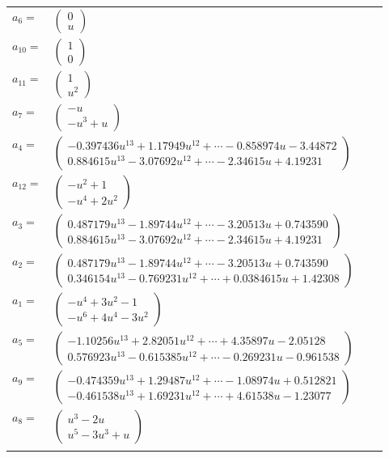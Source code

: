 \documentclass[1p]{elsarticle_modified}
\theoremstyle{definition}
\begin{document}
\begin{tabular}{m{7pt} m{180pt} m{7pt} m{180pt} }
\flushright $a_{6}=$&$\begin{pmatrix}0\\u\end{pmatrix}$ \\
\flushright $a_{10}=$&$\begin{pmatrix}1\\0\end{pmatrix}$ \\
\flushright $a_{11}=$&$\begin{pmatrix}1\\u^2\end{pmatrix}$ \\
\flushright $a_{7}=$&$\begin{pmatrix}- u\\- u^3+u\end{pmatrix}$ \\
\flushright $a_{4}=$&$\begin{pmatrix}-0.397436 u^{13}+1.17949 u^{12}+\cdots-0.858974 u-3.44872\\0.884615 u^{13}-3.07692 u^{12}+\cdots-2.34615 u+4.19231\end{pmatrix}$ \\
\flushright $a_{12}=$&$\begin{pmatrix}- u^2+1\\- u^4+2 u^2\end{pmatrix}$ \\
\flushright $a_{3}=$&$\begin{pmatrix}0.487179 u^{13}-1.89744 u^{12}+\cdots-3.20513 u+0.743590\\0.884615 u^{13}-3.07692 u^{12}+\cdots-2.34615 u+4.19231\end{pmatrix}$ \\
\flushright $a_{2}=$&$\begin{pmatrix}0.487179 u^{13}-1.89744 u^{12}+\cdots-3.20513 u+0.743590\\0.346154 u^{13}-0.769231 u^{12}+\cdots+0.0384615 u+1.42308\end{pmatrix}$ \\
\flushright $a_{1}=$&$\begin{pmatrix}- u^4+3 u^2-1\\- u^6+4 u^4-3 u^2\end{pmatrix}$ \\
\flushright $a_{5}=$&$\begin{pmatrix}-1.10256 u^{13}+2.82051 u^{12}+\cdots+4.35897 u-2.05128\\0.576923 u^{13}-0.615385 u^{12}+\cdots-0.269231 u-0.961538\end{pmatrix}$ \\
\flushright $a_{9}=$&$\begin{pmatrix}-0.474359 u^{13}+1.29487 u^{12}+\cdots-1.08974 u+0.512821\\-0.461538 u^{13}+1.69231 u^{12}+\cdots+4.61538 u-1.23077\end{pmatrix}$ \\
\flushright $a_{8}=$&$\begin{pmatrix}u^3-2 u\\u^5-3 u^3+u\end{pmatrix}$\\&\end{tabular}
\end{document}
